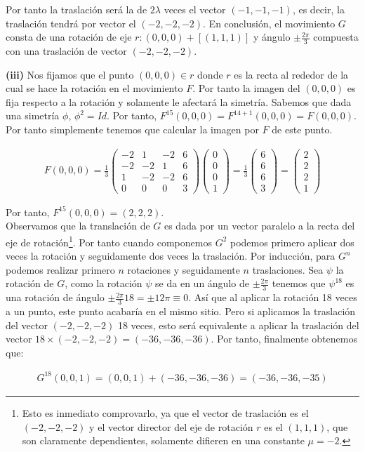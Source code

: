 Por tanto la traslación será la de $2\lambda$ veces el vector $(-1,-1,-1)$, es decir, la traslación tendrá por vector el $(-2,-2,-2)$. En conclusión, el movimiento $G$ consta de una rotación de eje $r:(0,0,0) + [(1,1,1)]$ y ángulo $\pm \frac{2\pi}{3}$ compuesta con una traslación de vector $(-2,-2,-2)$.

\pagebreak

\hspace*{10mm} \textbf{(iii)} Nos fijamos que el punto $(0,0,0) \in r$ donde $r$ es la recta al rededor de la cual se hace la rotación en el movimiento $F$. Por tanto la imagen del $(0,0,0)$ es fija respecto a la rotación y solamente le afectará la simetría. Sabemos que dada una simetría $\phi$, $\phi^{2} = Id$. Por tanto, $F^{15}(0,0,0) = F^{14 + 1}(0,0,0) = F(0,0,0)$. Por tanto simplemente tenemos que calcular la imagen por $F$ de este punto.

\begin{gather*}
    F(0,0,0) = \frac{1}{3}
    \begin{pmatrix}
    -2 & 1 & -2 & 6\\
    -2 & -2 & 1 & 6\\
    1 & -2 & -2 & 6\\
    0 & 0 & 0 & 3
    \end{pmatrix}
    \begin{pmatrix}0\\0\\0\\1 \end{pmatrix}
    = \frac{1}{3}
    \begin{pmatrix} 6\\6\\6\\3 \end{pmatrix}
    =
    \begin{pmatrix} 2\\2\\2\\1 \end{pmatrix}
\end{gather*}

Por tanto, $F^{15}(0,0,0) = (2,2,2)$.
\\

Observamos que la translación de $G$ es dada por un vector paralelo a la recta del eje de rotación\footnote{Esto es inmediato comprovarlo, ya que el vector de traslación es el $(-2,-2,-2)$ y el vector director del eje de rotación $r$ es el $(1,1,1)$, que son claramente dependientes, solamente difieren en una constante $\mu = -2$.}. Por tanto cuando componemos $G^2$ podemos primero aplicar dos veces la rotación y seguidamente dos veces la traslación. Por inducción, para $G^{n}$ podemos realizar primero $n$ rotaciones y seguidamente $n$ traslaciones. Sea $\psi$ la rotación de $G$, como la rotación $\psi$ se da en un ángulo de $\pm \frac{2\pi}{3}$ tenemos que $\psi^{18}$ es una rotación de ángulo $\pm \frac{2\pi}{3}18 = \pm 12\pi \equiv 0$. Así que al aplicar la rotación 18 veces a un punto, este punto acabaría en el mismo sitio. Pero si aplicamos la traslación del vector $(-2,-2,-2)$ 18 veces, esto será equivalente a aplicar la traslación del vector $18\times(-2,-2,-2) = (-36,-36,-36)$. Por tanto, finalmente obtenemos que:

\begin{gather*}
    G^{18}(0,0,1) = (0,0,1) + (-36,-36,-36) = (-36,-36,-35)
\end{gather*}